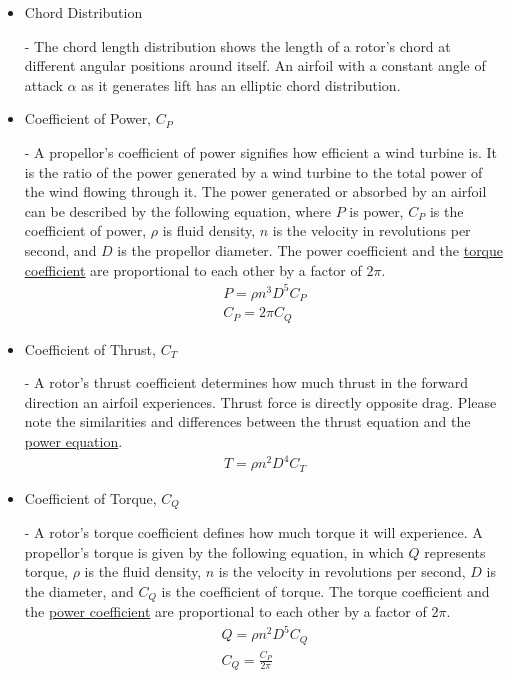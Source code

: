 \documentclass{article}
\begin{document}
\begin{itemize}
	\item \hypertarget{c}{Chord Distribution} - The chord length distribution shows the length of a rotor's chord at different angular positions around itself. An airfoil with a constant angle of attack $\alpha$ as it generates lift has an elliptic chord distribution.
	
	\item \hypertarget{CP}{Coefficient of Power, $C_{P}$} - A propellor's coefficient of power signifies how efficient a wind turbine is. It is the ratio of the power generated by a wind turbine to the total power of the wind flowing through it. The power generated or absorbed by an airfoil can be described by the following equation, where $P$ is power, $C_{P}$ is the coefficient of power, $\rho$ is fluid density, $n$ is the velocity in revolutions per second, and $D$ is the propellor diameter. The power coefficient and the \hyperlink{CT}{torque coefficient} are proportional to each other by a factor of $2\pi$.
	\begin{equation}
	\begin{aligned}
		P = \rho n^{3} D^{5} C_{P} \\
		C_{P} = 2 \pi C_{Q}
	\end{aligned}
	\end{equation}
	
	\item \hypertarget{CT}{Coefficient of Thrust, $C_{T}$} - A rotor's thrust coefficient determines how much thrust in the forward direction an airfoil experiences. Thrust force is directly opposite drag. Please note the similarities and differences between the thrust equation and the \hyperlink{CP}{power equation}.
	\begin{equation}
	\begin{aligned}
		T = \rho n^{2} D^{4} C_{T}
	\end{aligned}
	\end{equation}
	
	\item \hypertarget{CQ}{Coefficient of Torque, $C_{Q}$} - A rotor's torque coefficient defines how much torque it will experience. A propellor's torque is given by the following equation, in which $Q$ represents torque, $\rho$ is the fluid density, $n$ is the velocity in revolutions per second, $D$ is the diameter, and $C_{Q}$ is the coefficient of torque. The torque coefficient and the \hyperlink{CP}{power coefficient} are proportional to each other by a factor of $2\pi$.
	\begin{equation}
	\begin{aligned}
		Q = \rho n^{2} D^{5} C_{Q} \\
		C_{Q} = \frac{C_{P}}{2 \pi}
	\end{aligned}
	\end{equation}
	

\end{itemize}
\end{document}

